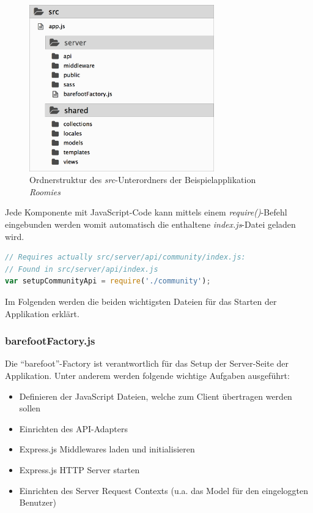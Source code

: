 \begin{figure}[H]
	\centering
	\includegraphics[width=8cm]{content/sad/images/folder-structure.png}
	\caption{Ordnerstruktur des \emph{src}-Unterordners der Beispielapplikation \emph{Roomies}}
	\label{fig:roomiesFolderStructure}
\end{figure}

Jede Komponente mit JavaScript-Code kann mittels einem \emph{require()}-Befehl eingebunden werden womit automatisch die enthaltene \emph{index.js}-Datei geladen wird.


\begin{lstlisting}[language=JavaScript, caption=Einbindung der Community-Komponente, float=ht!]
// Requires actually src/server/api/community/index.js:
// Found in src/server/api/index.js
var setupCommunityApi = require('./community');
\end{lstlisting}

Im Folgenden werden die beiden wichtigsten Dateien für das Starten der Applikation erklärt.

\subsubsection*{barefootFactory.js}
Die ``barefoot''-Factory \cite{barefootFactoryjs} ist verantwortlich für das Setup der Server-Seite der Applikation.
Unter anderem werden folgende wichtige Aufgaben ausgeführt:
\begin{itemize}
	\item Definieren der JavaScript Dateien, welche zum Client übertragen werden sollen
	\item Einrichten des API-Adapters
	\item Express.js \cite{Expressjs} Middlewares laden und initialisieren
	\item Express.js \cite{Expressjs} HTTP Server starten
	\item Einrichten des Server Request Contexts (u.a. das Model für den eingeloggten Benutzer)
\end{itemize}

